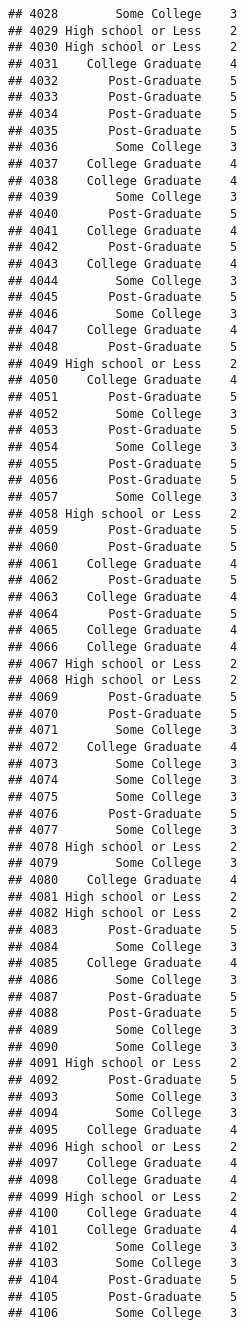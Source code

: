 \documentclass[
]{article}
\begin{document}
\begin{verbatim}
## 4028        Some College    3
## 4029 High school or Less    2
## 4030 High school or Less    2
## 4031    College Graduate    4
## 4032       Post-Graduate    5
## 4033       Post-Graduate    5
## 4034       Post-Graduate    5
## 4035       Post-Graduate    5
## 4036        Some College    3
## 4037    College Graduate    4
## 4038    College Graduate    4
## 4039        Some College    3
## 4040       Post-Graduate    5
## 4041    College Graduate    4
## 4042       Post-Graduate    5
## 4043    College Graduate    4
## 4044        Some College    3
## 4045       Post-Graduate    5
## 4046        Some College    3
## 4047    College Graduate    4
## 4048       Post-Graduate    5
## 4049 High school or Less    2
## 4050    College Graduate    4
## 4051       Post-Graduate    5
## 4052        Some College    3
## 4053       Post-Graduate    5
## 4054        Some College    3
## 4055       Post-Graduate    5
## 4056       Post-Graduate    5
## 4057        Some College    3
## 4058 High school or Less    2
## 4059       Post-Graduate    5
## 4060       Post-Graduate    5
## 4061    College Graduate    4
## 4062       Post-Graduate    5
## 4063    College Graduate    4
## 4064       Post-Graduate    5
## 4065    College Graduate    4
## 4066    College Graduate    4
## 4067 High school or Less    2
## 4068 High school or Less    2
## 4069       Post-Graduate    5
## 4070       Post-Graduate    5
## 4071        Some College    3
## 4072    College Graduate    4
## 4073        Some College    3
## 4074        Some College    3
## 4075        Some College    3
## 4076       Post-Graduate    5
## 4077        Some College    3
## 4078 High school or Less    2
## 4079        Some College    3
## 4080    College Graduate    4
## 4081 High school or Less    2
## 4082 High school or Less    2
## 4083       Post-Graduate    5
## 4084        Some College    3
## 4085    College Graduate    4
## 4086        Some College    3
## 4087       Post-Graduate    5
## 4088       Post-Graduate    5
## 4089        Some College    3
## 4090        Some College    3
## 4091 High school or Less    2
## 4092       Post-Graduate    5
## 4093        Some College    3
## 4094        Some College    3
## 4095    College Graduate    4
## 4096 High school or Less    2
## 4097    College Graduate    4
## 4098    College Graduate    4
## 4099 High school or Less    2
## 4100    College Graduate    4
## 4101    College Graduate    4
## 4102        Some College    3
## 4103        Some College    3
## 4104       Post-Graduate    5
## 4105       Post-Graduate    5
## 4106        Some College    3

\end{verbatim}
\end{document}
